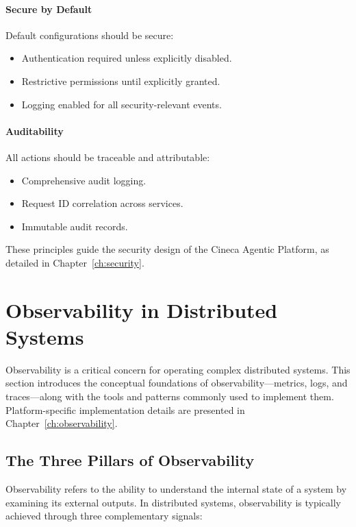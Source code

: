\documentclass[a4paper,twoside]{sapthesis}
\begin{document}
\paragraph{Secure by Default}

Default configurations should be secure:
\begin{itemize}
    \item Authentication required unless explicitly disabled.
    \item Restrictive permissions until explicitly granted.
    \item Logging enabled for all security-relevant events.
\end{itemize}

\paragraph{Auditability}

All actions should be traceable and attributable:
\begin{itemize}
    \item Comprehensive audit logging.
    \item Request ID correlation across services.
    \item Immutable audit records.
\end{itemize}

These principles guide the security design of the Cineca Agentic Platform, as detailed in Chapter~\ref{ch:security}.

\section{Observability in Distributed Systems}
\label{sec:observability-background}

Observability is a critical concern for operating complex distributed systems. This section introduces the conceptual foundations of observability---metrics, logs, and traces---along with the tools and patterns commonly used to implement them. Platform-specific implementation details are presented in Chapter~\ref{ch:observability}.

\subsection{The Three Pillars of Observability}

Observability refers to the ability to understand the internal state of a system by examining its external outputs. In distributed systems, observability is typically achieved through three complementary signals:
\end{document}
